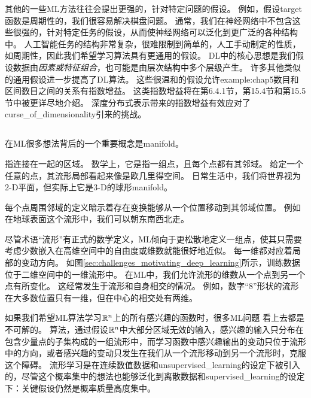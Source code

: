 其他的一些\gls{ML}方法往往会提出更强的，针对特定问题的假设。
例如，假设\gls{target}函数是周期性的，我们很容易解决棋盘问题。
通常，我们在神经网络中不包含这些很强的，针对特定任务的假设，从而使神经网络可以泛化到更广泛的各种结构中。
人工智能任务的结构非常复杂，很难限制到简单的，人工手动制定的性质，如周期性，因此我们希望学习算法具有更通用的假设。
\gls{DL}中的核心思想是我们假设数据由\emph{因素或特征组合}，也可能是由层次结构中多个层级产生。
许多其他类似的通用假设进一步提高了\gls{DL}算法。
这些很温和的假设允许\gls{example:chap5}数目和区间数目之间的关系有指数增益。
这类指数增益将在第6.4.1节，第15.4节和第15.5节中被更详尽地介绍。
深度分布式表示带来的指数增益有效应对了\gls{curse_of_dimensionality}引来的挑战。


\subsection{}
\label{sec:manifold_learning}
在\gls{ML}很多想法背后的一个重要概念是\gls{manifold}。

指连接在一起的区域。
数学上，它是指一组点，且每个点都有其邻域。
给定一个任意的点，其流形局部看起来像是欧几里得空间。
日常生活中，我们将世界视为2-D平面，但实际上它是3-D的球形\gls{manifold}。

每个点周围邻域的定义暗示着存在变换能够从一个位置移动到其邻域位置。
例如在地球表面这个流形中，我们可以朝东南西北走。

尽管术语“流形”有正式的数学定义，\gls{ML}倾向于更松散地定义一组点，使其只需要考虑少数嵌入在高维空间中的自由度或维数就能很好地近似。
每一维都对应着局部的变动方向。
如图\ref{sec:challenges_motivating_deep_learning}所示，训练数据位于二维空间中的一维流形中。
在\gls{ML}中，我们允许流形的维数从一个点到另一个点有所变化。
这经常发生于流形和自身相交的情况。
例如，数字“8”形状的流形在大多数位置只有一维，但在中心的相交处有两维。

如果我们希望\gls{ML}算法学习$\mathbb{R}^n$上的所有感兴趣的函数时，很多\gls{ML}问题
看上去都是不可解的。
算法，通过假设$\mathbb{R}^n$中大部分区域无效的输入，感兴趣的输入只分布在包含少量点的子集构成的一组流形中，而学习函数中感兴趣输出的变动只位于流形中的方向，或者感兴趣的变动只发生在我们从一个流形移动到另一个流形时，克服这个障碍。
流形学习是在连续数值数据和\gls{unsupervised_learning}的设定下被引入的，尽管这个概率集中的想法也能够泛化到离散数据和\gls{supervised_learning}的设定下：关键假设仍然是概率质量高度集中。


